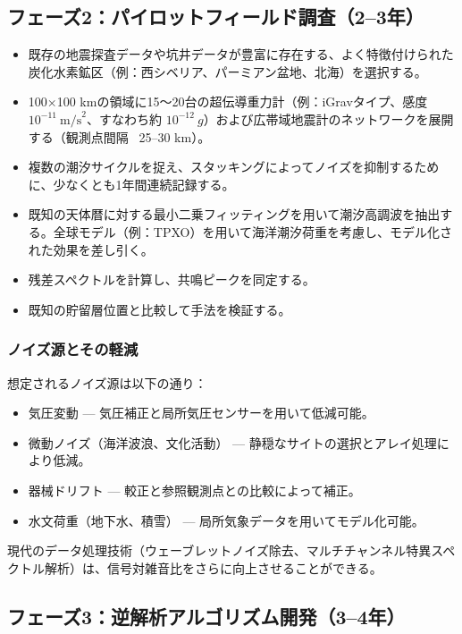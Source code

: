 \documentclass[12pt,a4paper]{article}
\theoremstyle{remark}
\begin{document}
	\subsection{フェーズ2：パイロットフィールド調査（2–3年）}
	
	\begin{itemize}
		\item 既存の地震探査データや坑井データが豊富に存在する、よく特徴付けられた炭化水素鉱区（例：西シベリア、パーミアン盆地、北海）を選択する。
		\item 100×100 kmの領域に15～20台の超伝導重力計（例：iGravタイプ、感度 \(10^{-11}\ \text{m/s}^2\)、すなわち約 \(10^{-12}\ g\)）および広帯域地震計のネットワークを展開する（観測点間隔 ~25–30 km）。
		\item 複数の潮汐サイクルを捉え、スタッキングによってノイズを抑制するために、少なくとも1年間連続記録する。
		\item 既知の天体暦に対する最小二乗フィッティングを用いて潮汐高調波を抽出する。全球モデル（例：TPXO）を用いて海洋潮汐荷重を考慮し、モデル化された効果を差し引く。
		\item 残差スペクトルを計算し、共鳴ピークを同定する。
		\item 既知の貯留層位置と比較して手法を検証する。
	\end{itemize}
	
	\subsubsection{ノイズ源とその軽減}
	
	想定されるノイズ源は以下の通り：
	\begin{itemize}
		\item 気圧変動 — 気圧補正と局所気圧センサーを用いて低減可能。
		\item 微動ノイズ（海洋波浪、文化活動） — 静穏なサイトの選択とアレイ処理により低減。
		\item 器械ドリフト — 較正と参照観測点との比較によって補正。
		\item 水文荷重（地下水、積雪） — 局所気象データを用いてモデル化可能。
	\end{itemize}
	
	現代のデータ処理技術（ウェーブレットノイズ除去、マルチチャンネル特異スペクトル解析）は、信号対雑音比をさらに向上させることができる。
	
	\subsection{フェーズ3：逆解析アルゴリズム開発（3–4年）}
	
\end{document}
